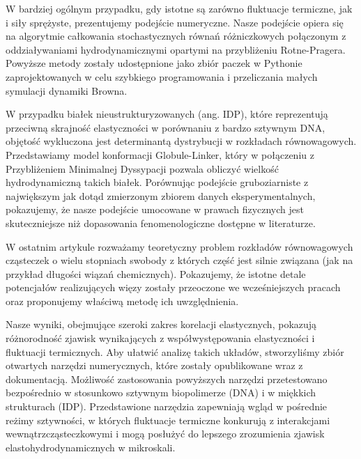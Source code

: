 W bardziej ogólnym przypadku, gdy istotne są zarówno fluktuacje termiczne, jak i siły sprężyste, prezentujemy podejście numeryczne.
Nasze podejście opiera się na algorytmie całkowania stochastycznych równań różniczkowych połączonym z oddziaływaniami hydrodynamicznymi opartymi na przybliżeniu Rotne-Pragera.
Powyższe metody zostały udostępnione jako zbiór paczek w Pythonie zaprojektowanych w celu szybkiego programowania i przeliczania małych symulacji dynamiki Browna.

W przypadku białek nieustrukturyzowanych (ang. IDP), które reprezentują przeciwną skrajność elastyczności w porównaniu z bardzo sztywnym DNA, objętość wykluczona jest determinantą dystrybucji w rozkładach równowagowych.
Przedstawiamy model konformacji Globule-Linker, który w połączeniu z Przybliżeniem Minimalnej Dyssypacji pozwala obliczyć wielkość hydrodynamiczną takich białek.
Porównując podejście gruboziarniste z największym jak dotąd zmierzonym zbiorem danych eksperymentalnych, pokazujemy, że nasze podejście umocowane w prawach fizycznych jest skuteczniejsze niż dopasowania fenomenologiczne dostępne w literaturze.

W ostatnim artykule rozważamy teoretyczny problem rozkładów równowagowych cząsteczek o wielu stopniach swobody z których część jest silnie związana (jak na przykład długości wiązań chemicznych).
Pokazujemy, że istotne detale potencjałów realizujących więzy zostały przeoczone we wcześniejszych pracach oraz proponujemy właściwą metodę ich uwzględnienia.

Nasze wyniki, obejmujące szeroki zakres korelacji elastycznych, pokazują różnorodność zjawisk wynikających z współwystępowania elastyczności i fluktuacji termicznych.
Aby ułatwić analizę takich układów, stworzyliśmy zbiór otwartych narzędzi numerycznych, które zostały opublikowane wraz z dokumentacją.
Możliwość zastosowania powyższych narzędzi przetestowano bezpośrednio w stosunkowo sztywnym biopolimerze (DNA) i w miękkich strukturach (IDP).
Przedstawione narzędzia zapewniają wgląd w pośrednie reżimy sztywności, w których fluktuacje termiczne konkurują z interakcjami wewnątrzcząsteczkowymi i mogą posłużyć do lepszego zrozumienia zjawisk elastohydrodynamicznych w mikroskali.
